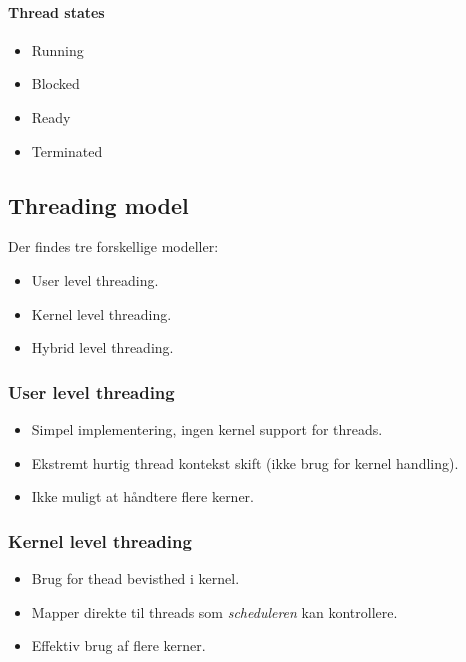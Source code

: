\paragraph{Thread states}
\begin{itemize}
	\item Running
	\item Blocked
	\item Ready
	\item Terminated
\end{itemize}


\subsection{Threading model}
Der findes tre forskellige modeller:

\begin{itemize}
	\item User level threading.
	\item Kernel level threading.
	\item Hybrid level threading.
\end{itemize}

\subsubsection*{User level threading}
\begin{itemize}
	\item Simpel implementering, ingen kernel support for threads.
	\item Ekstremt hurtig thread kontekst skift (ikke brug for kernel handling).
	\item Ikke muligt at håndtere flere kerner.
\end{itemize}


\subsubsection*{Kernel level threading}
\begin{itemize}
	\item Brug for thead bevisthed i kernel.
	\item Mapper direkte til threads som \textit{scheduleren} kan kontrollere.
	\item Effektiv brug af flere kerner.
\end{itemize}

